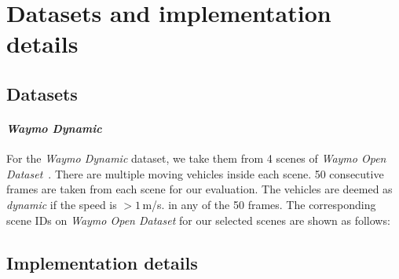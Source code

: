\section{Datasets and implementation details}\label{sec:sup_dataset}
\subsection{Datasets}
\paragraph{\textit{Waymo Dynamic}} For the \textit{Waymo Dynamic} dataset, we take them from 4 scenes of \textit{Waymo Open Dataset}~\cite{sun2020scalability}. There are multiple moving vehicles inside each scene. 50 consecutive frames are taken from each scene for our evaluation. The vehicles are deemed as \textit{dynamic} if the speed is $>1\,$m/s. in any of the 50 frames. The corresponding scene IDs on \textit{Waymo Open Dataset} for our selected scenes are shown as follows:
\begin{table}[!h]
    \setlength{\tabcolsep}{4pt}
    \renewcommand{\arraystretch}{1.2}
	\centering
\end{table}




\subsection{Implementation details}
